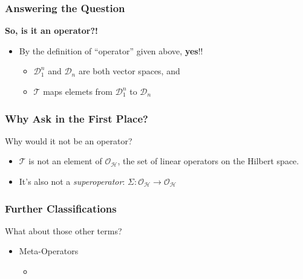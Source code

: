 \documentclass{beamer}
\begin{document}
\begin{frame}
    \frametitle{Answering the Question}
    \alert{\textbf{So, is it an operator?!}}
    \begin{itemize}
        \item[\textbullet]<2-> By the definition of ``operator'' given above, \textbf{yes}!!
        \begin{itemize}
            \item[\textbullet]<3-> $\mathcal{D}_1^n$ and $\mathcal{D}_n$ are both vector spaces, and
            \item[\textbullet]<4-> $\mathscr{T}$ maps elemets from $\mathcal{D}_1^n$ to $\mathcal{D}_n$  
        \end{itemize}
    \end{itemize}
\end{frame}

\begin{frame}
\frametitle{Why Ask in the First Place?}
\alert{Why would it not be an operator?}
\begin{itemize}
    \item[\textbullet]<2-> $\mathscr{T}$ is not an element of $\mathcal{O}_{\mathcal{H}}$, the set of linear operators on the Hilbert space.
    \item[\textbullet]<3-> It's also not a \textit{superoperator}: $\Sigma: \mathcal{O}_{\mathcal{H}} \to \mathcal{O}_{\mathcal{H}}$ 
\end{itemize}
\end{frame}

\begin{frame}
\frametitle{Further Classifications}
\alert{What about those other terms?}
\begin{itemize}
    \item<2-> Meta-Operators
    \begin{itemize}
        \item<3-> 
    \end{itemize}
\end{itemize}
\end{frame}
\end{document}
